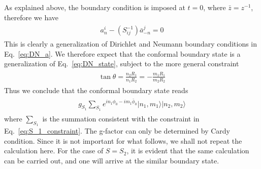 As explained above, the boundary condition is imposed at $t=0$, where $\bar{z}=z^{-1}$, therefore we have
\begin{eqnarray}\begin{aligned}
a^i_n-(S^{-1}_{ij})\bar{a}^j_{-n}=0
\end{aligned}\end{eqnarray}
This is clearly a generalization of Dirichlet and Neumann boundary conditions in Eq.~\eqref{eq:DN_a}. We therefore expect that the conformal boundary state is a generalization of Eq.~\eqref{eq:DN_state}, subject to the more general constraint 
\begin{eqnarray}\begin{aligned}
\label{eq:S_1_constraint}
\tan\theta=\frac{n_2R_1}{n_1R_2}=-\frac{m_1R_1}{m_2R_2}
\end{aligned}\end{eqnarray}
Thus we conclude that the conformal boundary state reads
\begin{eqnarray}\begin{aligned}
g_{S_1}\sum_{S_1}e^{in_1\phi_0-im_1\bar{\phi}_0}|n_1,m_1\rangle|n_2,m_2\rangle
\end{aligned}\end{eqnarray}
where $\sum_{S_1}$ is the summation consistent with the constraint in Eq.~\eqref{eq:S_1_constraint}. The g-factor can only be determined by Cardy condition\cite{oshikawa_boundary_2010}. Since it is not important for what follows, we shall not repeat the calculation here. For the case of $S=S_2$, it is evident that the same calculation can be carried out, and one will arrive at the similar boundary state.

